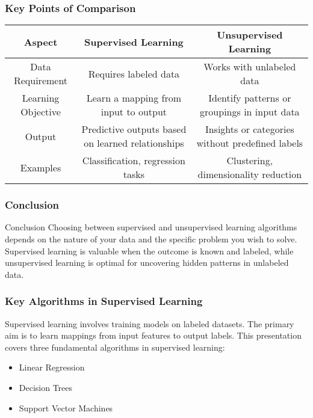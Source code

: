\documentclass[aspectratio=169]{beamer}
\begin{document}
\begin{frame}[fragile]
    \frametitle{Key Points of Comparison}
    \begin{table}[ht]
        \centering
        \begin{tabular}{|c|c|c|}
            \hline
            \textbf{Aspect} & \textbf{Supervised Learning} & \textbf{Unsupervised Learning} \\
            \hline
            Data Requirement & Requires labeled data & Works with unlabeled data \\
            \hline
            Learning Objective & Learn a mapping from input to output & Identify patterns or groupings in input data \\
            \hline
            Output & Predictive outputs based on learned relationships & Insights or categories without predefined labels \\
            \hline
            Examples & Classification, regression tasks & Clustering, dimensionality reduction \\
            \hline
        \end{tabular}
    \end{table}
\end{frame}

\begin{frame}[fragile]
    \frametitle{Conclusion}
    \begin{block}{Conclusion}
        Choosing between supervised and unsupervised learning algorithms depends on the nature of your data and the specific problem you wish to solve. Supervised learning is valuable when the outcome is known and labeled, while unsupervised learning is optimal for uncovering hidden patterns in unlabeled data.
    \end{block}
\end{frame}

\begin{frame}[fragile]
    \frametitle{Key Algorithms in Supervised Learning}
    Supervised learning involves training models on labeled datasets. The primary aim is to learn mappings from input features to output labels. This presentation covers three fundamental algorithms in supervised learning:
    \begin{itemize}
        \item Linear Regression
        \item Decision Trees
        \item Support Vector Machines
    \end{itemize}
\end{frame}
\end{document}
